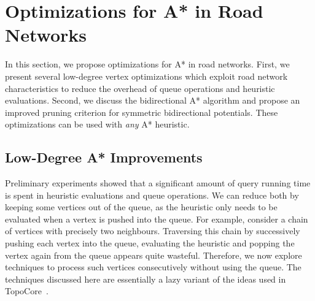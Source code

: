 \documentclass[manuscript]{acmart}
\begin{document}

\section{Optimizations for A* in Road Networks}\label{sec:astar_opts}

In this section, we propose optimizations for A* in road networks.
First, we present several low-degree vertex optimizations which exploit road network characteristics to reduce the overhead of queue operations and heuristic evaluations.
Second, we discuss the bidirectional A* algorithm and propose an improved pruning criterion for symmetric bidirectional potentials.
These optimizations can be used with \emph{any} A* heuristic.

\subsection{Low-Degree A* Improvements}\label{sec:low-deg-improvment}

Preliminary experiments showed that a significant amount of query running time is spent in heuristic evaluations and queue operations.
We can reduce both by keeping some vertices out of the queue, as the heuristic only needs to be evaluated when a vertex is pushed into the queue.
For example, consider a chain of vertices with precisely two neighbours.
Traversing this chain by successively pushing each vertex into the queue, evaluating the heuristic and popping the vertex again from the queue appears quite wasteful.
Therefore, we now explore techniques to process such vertices consecutively without using the queue.
The techniques discussed here are essentially a lazy variant of the ideas used in TopoCore~\cite{DBLP:conf/gis/DibbeltSW15}.
\end{document}
